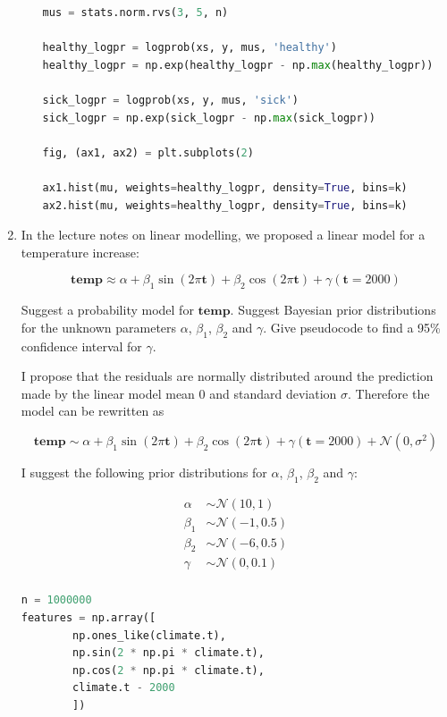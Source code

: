 \documentclass[10pt,\jkfside,a4paper]{article}
\begin{document}
\begin{enumerate}
\begin{enumerate}[label=(\alph*)]
\begin{lstlisting}[language=Python]
mus = stats.norm.rvs(3, 5, n)

healthy_logpr = logprob(xs, y, mus, 'healthy')
healthy_logpr = np.exp(healthy_logpr - np.max(healthy_logpr))

sick_logpr = logprob(xs, y, mus, 'sick')
sick_logpr = np.exp(sick_logpr - np.max(sick_logpr))

fig, (ax1, ax2) = plt.subplots(2)

ax1.hist(mu, weights=healthy_logpr, density=True, bins=k)
ax2.hist(mu, weights=healthy_logpr, density=True, bins=k)

\end{lstlisting}

\end{enumerate}

\item In the lecture notes on linear modelling, we proposed a linear model
for a temperature increase:

\[
\mathbf{temp} \approx \alpha + \beta_1\sin(2\pi \mathbf{t}) + \beta_2 \cos
(2\pi \mathbf{t}) + \gamma(\mathbf{t} = 2000)
\]

Suggest a probability model for $\mathbf{temp}$. Suggest Bayesian prior
distributions for the unknown parameters $\alpha$, $\beta_1$, $\beta_2$ and
$\gamma$. Give pseudocode to find a 95\% confidence interval for $\gamma$.

I propose that the residuals are normally distributed around the
prediction made by the linear model mean 0 and standard deviation $\sigma$.
Therefore the model can be rewritten as

\[
\mathbf{temp} \sim \alpha + \beta_1\sin(2\pi \mathbf{t}) + \beta_2 \cos
(2\pi \mathbf{t}) + \gamma(\mathbf{t} = 2000) + \mathcal{N}(0, \sigma^2)
\]

I suggest the following prior distributions for $\alpha$, $\beta_1$,
$\beta_2$ and $\gamma$:

\begin{align*}
\alpha &\sim \mathcal{N}(10, 1) \\
\beta_1 &\sim \mathcal{N}(-1, 0.5) \\
\beta_2 &\sim \mathcal{N}(-6, 0.5) \\
\gamma &\sim \mathcal{N}(0, 0.1) \\
\end{align*}

\begin{lstlisting}[language=Python]
n = 1000000
features = np.array([
		np.ones_like(climate.t),
		np.sin(2 * np.pi * climate.t),
		np.cos(2 * np.pi * climate.t),
		climate.t - 2000
		])


\end{lstlisting}
\end{enumerate}
\end{document}
